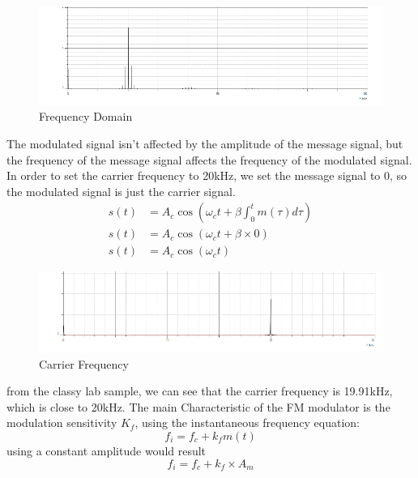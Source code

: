 \documentclass[12pt]{article}
\begin{document}
\begin{figure}[H]
    \centering
    \includegraphics[width=1\textwidth]{assets/freqeuncy_domain.png}
    \caption{Frequency Domain}
\end{figure}
The modulated signal isn't affected by the amplitude of the message signal, but the frequency of the message signal affects the frequency of the modulated signal.
In order to set the carrier frequency to 20kHz, we set the message signal to 0, so the modulated signal is just the carrier signal.
\begin{equation}
    \begin{aligned}
        s(t) &= A_c \cos({\omega}_c t + \beta\int_{0}^{t} m(\tau) d\tau) \\
        s(t) &= A_c \cos({\omega}_c t + \beta\times 0)\\
        s(t) &= A_c \cos({\omega}_c t)
    \end{aligned}
\end{equation}
\begin{figure}[H]
    \centering
    \includegraphics[width=1\textwidth]{assets/carrier.png}
    \caption{Carrier Frequency}
\end{figure}
from the classy lab sample, we can see that the carrier frequency is 19.91kHz, which is close to 20kHz.
The main Characteristic of the FM modulator is the modulation sensitivity $K_f$, using the instantaneous frequency equation:
\begin{equation}
    f_i = f_c + k_f m(t)
\end{equation}
using a constant amplitude would result
\begin{equation}
    f_i = f_c + k_f \times A_m
\end{equation}
\end{document}
